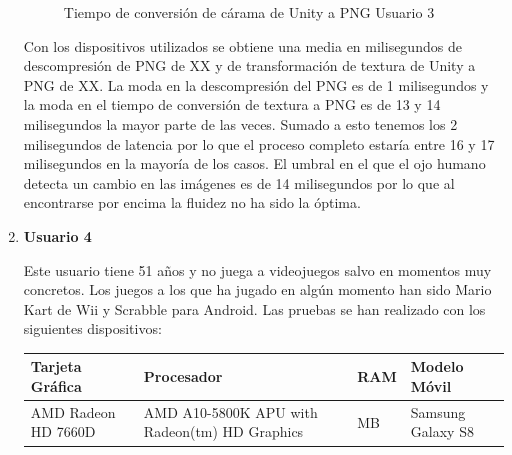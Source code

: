 \begin{enumerate}
\begin{figure}[!h]
\centering
{}%
\caption{Tiempo de conversi\'on de c\'arama de Unity a PNG Usuario 3}
\end{figure}

Con los dispositivos utilizados se obtiene una media en milisegundos de descompresi\'on de PNG de XX y de transformaci\'on de textura de Unity a PNG de XX. La moda en la descompresi\'on del PNG es de 1 milisegundos y la moda en el tiempo de conversi\'on de textura a PNG es de 13 y 14 milisegundos la mayor parte de las veces. Sumado a esto tenemos los 2 milisegundos de latencia por lo que el proceso completo estar\'ia entre 16 y 17 milisegundos en la mayor\'ia de los casos. El umbral en el que el ojo humano detecta un cambio en las im\'agenes es de 14 milisegundos por lo que al encontrarse por encima la fluidez no ha sido la \'optima.


\item \textbf{Usuario 4}

Este usuario tiene 51 a\~nos y no juega a videojuegos salvo en momentos muy concretos. Los juegos a los que ha jugado en alg\'un momento han sido Mario Kart de Wii y Scrabble para Android.
Las pruebas se han realizado con los siguientes dispositivos: \\

\begin{tabularx}{1.0\textwidth} { 
  | >{\centering\arraybackslash}X 
  | >{\centering\arraybackslash}X 
  | >{\centering\arraybackslash}X 
  | >{\centering\arraybackslash}X | }
 \hline
 \textbf{Tarjeta Gr\'afica} & \textbf{Procesador} & \textbf{RAM} & \textbf{Modelo M\'ovil} \\
 \hline
AMD Radeon HD 7660D  & AMD A10-5800K APU with Radeon(tm) HD Graphics  & 7367 MB & Samsung Galaxy S8  \\
\hline
\end{tabularx}



\end{enumerate}

